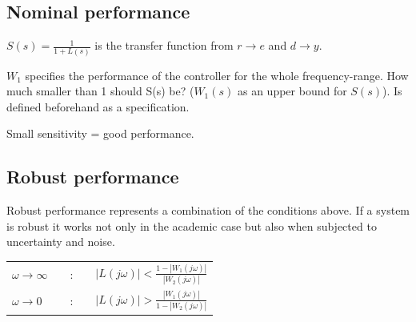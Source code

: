 \documentclass[10pt,a4paper]{scrartcl}
\begin{document}
\begin{multicols*}{3}
	
	
	\subsection*{Nominal performance}
	
	$S(s)=\frac{1}{1+L(s)}$ is the transfer function from $r\rightarrow e$ and $d\rightarrow y$.
	
	$W_1$ specifies the performance of the controller for the whole frequency-range. How much smaller than 1 should S(s) be? ($W_1(s)$ as an upper bound for $S(s)$). Is defined beforehand as a specification.
	
	\dahe Small sensitivity = good performance.
	
	
	
	\subsection*{Robust performance}
	
	Robust performance represents a combination of the conditions above. If a system is robust it works not only in the academic case but also when subjected to uncertainty and noise.
	
	
	
	
	\begin{center}
	\begin{tabular}{|lll|}
	\hline
	$\omega\rightarrow\infty$&$\quad$:$\quad$&$|L(j\omega)|<\frac{1-|W_1(j\omega)|}{|W_2(j\omega)|}$\\
	$\omega\rightarrow 0$&$\quad$:$\quad$&$|L(j\omega)|>\frac{|W_1(j\omega)|}{1-|W_2(j\omega)|}$\\
	\hline
	\end{tabular}	
	\end{center}	
	

\end{multicols*}
\end{document}
